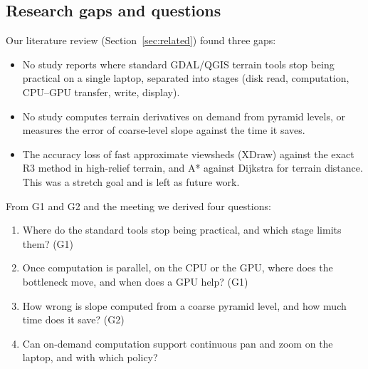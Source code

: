 \documentclass[11pt,a4paper]{article}
\begin{document}
\subsection{Research gaps and questions}
Our literature review (Section~\ref{sec:related}) found three gaps:
\begin{itemize}
  \item[\textbf{G1}] No study reports where standard GDAL/QGIS terrain tools stop being practical on a single laptop,
  separated into stages (disk read, computation, CPU--GPU transfer, write, display).
  \item[\textbf{G2}] No study computes terrain derivatives on demand from pyramid levels, or measures the error of
  coarse-level slope against the time it saves.
  \item[\textbf{G3}] The accuracy loss of fast approximate viewsheds (XDraw) against the exact R3 method in
  high-relief terrain, and A* against Dijkstra for terrain distance. This was a stretch goal and is left as future
  work.
\end{itemize}
From G1 and G2 and the meeting we derived four questions:
\begin{enumerate}
  \item[\textbf{Q1}] Where do the standard tools stop being practical, and which stage limits them? (G1)
  \item[\textbf{Q2}] Once computation is parallel, on the CPU or the GPU, where does the bottleneck move, and when
  does a GPU help? (G1)
  \item[\textbf{Q3}] How wrong is slope computed from a coarse pyramid level, and how much time does it save? (G2)
  \item[\textbf{Q4}] Can on-demand computation support continuous pan and zoom on the laptop, and with which policy?
\end{enumerate}
\end{document}
